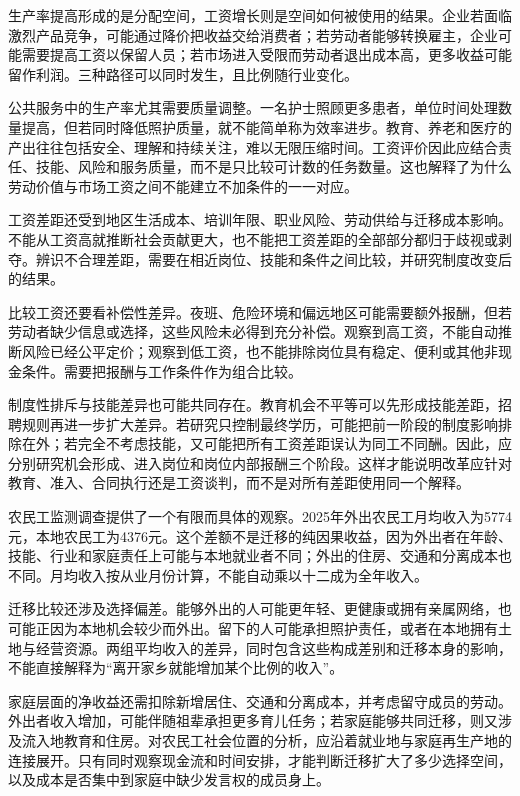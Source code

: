 \documentclass[UTF8,fontset=fandol,zihao=-4,oneside,openany]{ctexbook}
\begin{document}
\label{arg:P063}
生产率提高形成的是分配空间，工资增长则是空间如何被使用的结果。企业若面临激烈产品竞争，可能通过降价把收益交给消费者；若劳动者能够转换雇主，企业可能需要提高工资以保留人员；若市场进入受限而劳动者退出成本高，更多收益可能留作利润。三种路径可以同时发生，且比例随行业变化。

公共服务中的生产率尤其需要质量调整。一名护士照顾更多患者，单位时间处理数量提高，但若同时降低照护质量，就不能简单称为效率进步。教育、养老和医疗的产出往往包括安全、理解和持续关注，难以无限压缩时间。工资评价因此应结合责任、技能、风险和服务质量，而不是只比较可计数的任务数量。这也解释了为什么劳动价值与市场工资之间不能建立不加条件的一一对应。

工资差距还受到地区生活成本、培训年限、职业风险、劳动供给与迁移成本影响。不能从工资高就推断社会贡献更大，也不能把工资差距的全部部分都归于歧视或剥夺。辨识不合理差距，需要在相近岗位、技能和条件之间比较，并研究制度改变后的结果。

\label{arg:P064}
比较工资还要看补偿性差异。夜班、危险环境和偏远地区可能需要额外报酬，但若劳动者缺少信息或选择，这些风险未必得到充分补偿。观察到高工资，不能自动推断风险已经公平定价；观察到低工资，也不能排除岗位具有稳定、便利或其他非现金条件。需要把报酬与工作条件作为组合比较。

制度性排斥与技能差异也可能共同存在。教育机会不平等可以先形成技能差距，招聘规则再进一步扩大差异。若研究只控制最终学历，可能把前一阶段的制度影响排除在外；若完全不考虑技能，又可能把所有工资差距误认为同工不同酬。因此，应分别研究机会形成、进入岗位和岗位内部报酬三个阶段。这样才能说明改革应针对教育、准入、合同执行还是工资谈判，而不是对所有差距使用同一个解释。

农民工监测调查提供了一个有限而具体的观察。2025年外出农民工月均收入为5774元，本地农民工为4376元。这个差额不是迁移的纯因果收益，因为外出者在年龄、技能、行业和家庭责任上可能与本地就业者不同；外出的住房、交通和分离成本也不同。月均收入按从业月份计算，不能自动乘以十二成为全年收入。\cite{Migrant2025}

\label{arg:P065}
迁移比较还涉及选择偏差。能够外出的人可能更年轻、更健康或拥有亲属网络，也可能正因为本地机会较少而外出。留下的人可能承担照护责任，或者在本地拥有土地与经营资源。两组平均收入的差异，同时包含这些构成差别和迁移本身的影响，不能直接解释为“离开家乡就能增加某个比例的收入”。

家庭层面的净收益还需扣除新增居住、交通和分离成本，并考虑留守成员的劳动。外出者收入增加，可能伴随祖辈承担更多育儿任务；若家庭能够共同迁移，则又涉及流入地教育和住房。对农民工社会位置的分析，应沿着就业地与家庭再生产地的连接展开。只有同时观察现金流和时间安排，才能判断迁移扩大了多少选择空间，以及成本是否集中到家庭中缺少发言权的成员身上。
\end{document}
